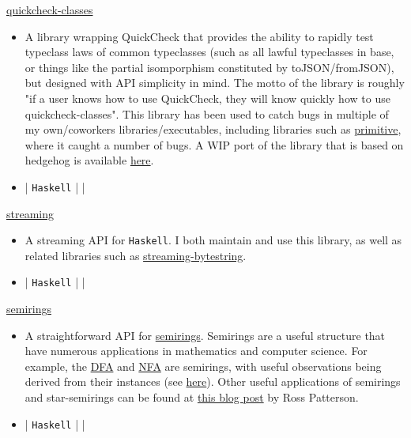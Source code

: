 \documentclass[10pt,letterpaper,sans]{moderncv}
\newcommand{\wlink}[2]{\textcolor[HTML]{461645}{\href{#1}{#2}}}
\newcommand{\ghlink}[2]{\wlink{https://github.com/#1}{#2}}
\newcommand{\ghrepo}[1]{\ghlink{#1}{\faGithub}}
\newcommand{\ghlang}[1]{\texttt{#1}}
\newcommand{\ghadd}[1]{\textcolor[HTML]{30A622}{{\faPlusCircle} #1}}
\newcommand{\ghrem}[1]{\textcolor[HTML]{BD2C00}{{\faMinusCircle} #1}}
\newcommand{\ghub}[4]{\ghrepo{#2} | \ghlang{#1} | \ghadd{#3} | \ghrem{#4}}
\newcommand{\lang}[1]{\texttt{#1}}
\begin{document}
\cventry{}
        {\wlink{https://github.com/andrewthad/quickcheck-classes}{quickcheck-classes}}
        {}{}{}
        {
\begin{itemize}
\item A library wrapping QuickCheck that provides the ability to rapidly test typeclass laws of common typeclasses (such as all lawful typeclasses in base, or things like the partial isomporphism constituted by toJSON/fromJSON), but designed with API simplicity in mind. The motto of the library is roughly "if a user knows how to use QuickCheck, they will know quickly how to use quickcheck-classes". This library has been used to catch bugs in multiple of my own/coworkers libraries/executables, including libraries such as \wlink{https://github.com/haskell/primitive}{primitive}, where it caught a number of bugs. A WIP port of the library that is based on hedgehog is available \wlink{https://github.com/chessai/hedgehog-classes}{here}.
\item \ghub{Haskell}{andrewthad/quickcheck-classes}{}{}
\end{itemize}
}


\cventry{}
        {\wlink{https://github.com/haskell-streaming/streaming}{streaming}}
        {}{}{}
        {
\begin{itemize}
\item A streaming API for \lang{Haskell}. I both maintain and use this library, as well as related libraries such as \wlink{https://github.com/haskell-streaming/streaming-bytestring}{streaming-bytestring}.
\item \ghub{Haskell}{haskell-streaming/streaming}{}{}
\end{itemize}
}

\cventry{}
        {\wlink{https://github.com/chessai/semirings}{semirings}}
        {}{}{}
        {
\begin{itemize}
\item A straightforward API for \wlink{https://en.wikipedia.org/wiki/Semiring}{semirings}. Semirings are a useful structure that have numerous applications in mathematics and computer science. For example, the \wlink{https://en.wikipedia.org/wiki/Deterministic_finite_automaton}{DFA} and \wlink{https://en.wikipedia.org/wiki/Nondeterministic_finite_automaton}{NFA} are semirings, with useful observations being derived from their instances (see \wlink{https://github.com/andrewthad/automata/blob/c7936f3705bf9b330c42f62d0350037ecad611dd/src/Automata/Internal.hs##L427-L439}{here}). Other useful applications of semirings and star-semirings can be found at \wlink{http://r6.ca/blog/20110808T035622Z.html}{this blog post} by Ross Patterson.
\item \ghub{Haskell}{chessai/semirings}{}{}
\end{itemize}
}
\end{document}
